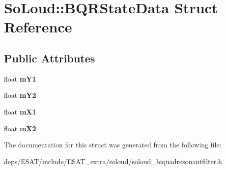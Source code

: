\hypertarget{struct_so_loud_1_1_b_q_r_state_data}{}\section{So\+Loud\+:\+:B\+Q\+R\+State\+Data Struct Reference}
\label{struct_so_loud_1_1_b_q_r_state_data}
\subsection*{Public Attributes}
\begin{DoxyCompactItemize}
\item 
\mbox{\label{struct_so_loud_1_1_b_q_r_state_data_a80b0ecee8f145458a18168971bcbf88d}} 
float {\bfseries m\+Y1}
\item 
\mbox{\label{struct_so_loud_1_1_b_q_r_state_data_a143a6664fd0bb1a4d1be9b53796bf93c}} 
float {\bfseries m\+Y2}
\item 
\mbox{\label{struct_so_loud_1_1_b_q_r_state_data_ae5f9b17ba8305d7ef6e07fc682aea939}} 
float {\bfseries m\+X1}
\item 
\mbox{\label{struct_so_loud_1_1_b_q_r_state_data_ae614479ecebade22c1a941e1a2fbe6b0}} 
float {\bfseries m\+X2}
\end{DoxyCompactItemize}


The documentation for this struct was generated from the following file\+:\begin{DoxyCompactItemize}
\item 
deps/\+E\+S\+A\+T/include/\+E\+S\+A\+T\+\_\+extra/soloud/soloud\+\_\+biquadresonantfilter.\+h\end{DoxyCompactItemize}
